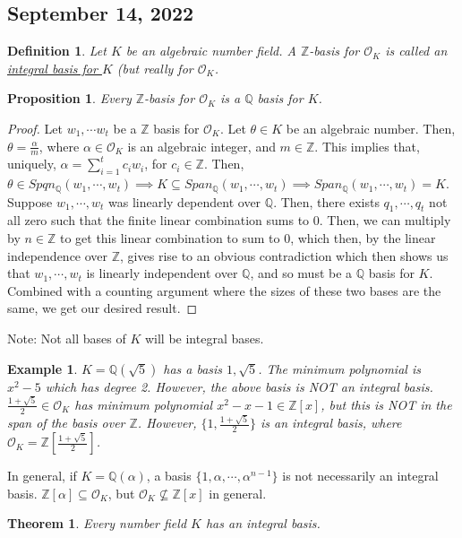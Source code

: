 \documentclass{article}
\newcommand{\air}{\mathcal{O}_K}
\newcommand{\Q}{\mathbb{Q}}
\newcommand{\Z}{\mathbb{Z}}
\newtheorem{theorem}{Theorem}
\newtheorem{example}{Example}
\newtheorem{proposition}{Proposition}
\newtheorem{definition}{Definition}
\begin{document}
\subsection{September 14, 2022}
\begin{definition}
Let $K$ be an algebraic number field. A $\Z$-basis for $\mathcal{O}_K$ is called an \underline{integral basis for $K$} (but really for $\mathcal{O}_K$.
\end{definition}
\begin{proposition}
Every $\Z$-basis for $\mathcal{O}_K$ is a $\Q$ basis for $K$. 
\end{proposition}
\begin{proof}
Let $w_1,\cdots w_t$ be a $\Z$ basis for $\mathcal{O}_K$. Let $\theta\in K$ be an algebraic number. Then, $\theta=\frac{\alpha}{m}$, where $\alpha\in\mathcal{O}_K$ is an algebraic integer, and $m\in\Z$. This implies that, uniquely, $\alpha=\displaystyle\sum_{i=1}^tc_iw_i$, for $c_i\in\Z$. Then, $\theta\in Spqn_\Q(w_1,\cdots, w_t)\implies K\subseteq Span_\Q(w_1,\cdots, w_t)\implies Span_\Q(w_1,\cdots, w_t)=K$. Suppose $w_1,\cdots, w_t$ was linearly dependent over $\Q$. Then, there exists $q_1,\cdots, q_t$ not all zero such that the finite linear combination sums to 0. Then, we can multiply by $n\in\Z$ to get this linear combination to sum to 0, which then, by the linear independence over $\Z$, gives rise to an obvious contradiction which then shows us that $w_1,\cdots, w_t$ is linearly independent over $\Q$, and so must be a $\Q$ basis for $K$. Combined with a counting argument where the sizes of these two bases are the same, we get our desired result.
\end{proof}
\noindent Note: Not all bases of $K$ will be integral bases.
\begin{example}
$K=\Q(\sqrt{5})$ has a basis $1,\sqrt{5}$. The minimum polynomial is $x^2-5$ which has degree 2. However, the above basis is NOT an integral basis. $\frac{1+\sqrt{5}}{2}\in\air$ has minimum polynomial $x^2-x-1\in\Z[x]$, but this is NOT in the span of the basis over $\Z$. However, $\{1,\frac{1+\sqrt{5}}{2}\}$ is an integral basis, where $\air =\Z\left[\frac{1+\sqrt{5}}{2}\right]$.
\end{example}
\noindent In general, if $K=\Q(\alpha)$, a basis $\{1,\alpha,\cdots, \alpha^{n-1}\}$ is not necessarily an integral basis. $\Z[\alpha]\subseteq \air$, but $\air\not\subseteq \Z[x]$ in general.
\begin{theorem}
Every number field $K$ has an integral basis.
\end{theorem}
\end{document}
